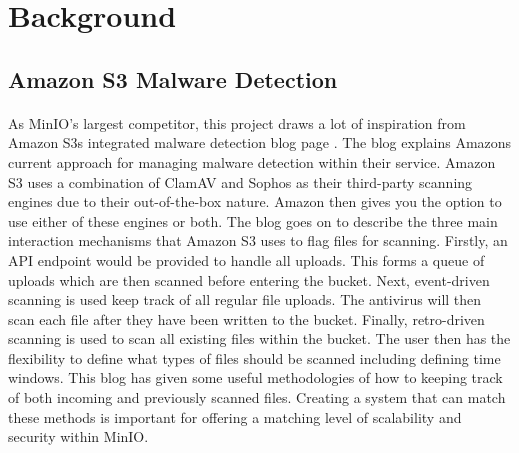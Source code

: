 \documentclass[12pt, conference, final, a4paper, onecolumn, compsoc]{IEEEtran}
\begin{document}
\section{Background}


%

%

\subsection*{Amazon S3 Malware Detection} %
\paragraph{}

As MinIO's largest competitor, this project draws a lot of inspiration from
Amazon S3s integrated malware detection blog page \citep{amazon-md}. The blog
explains Amazons current approach for managing malware detection within their
service. Amazon S3 uses a combination of ClamAV and Sophos as their third-party
scanning engines due to their out-of-the-box nature. Amazon then gives you the
option to use either of these engines or both. The blog goes on to describe the
three main interaction mechanisms that Amazon S3 uses to flag files for
scanning. Firstly, an API endpoint would be provided to handle all uploads. This
forms a queue of uploads which are then scanned before entering the bucket.
Next, event-driven scanning is used keep track of all regular file uploads. The
antivirus will then scan each file after they have been written to the bucket.
Finally, retro-driven scanning is used to scan all existing files within the
bucket. The user then has the flexibility to define what types of files should
be scanned including defining time windows. This blog has given some useful
methodologies of how to keeping track of both incoming and previously scanned
files. Creating a system that can match these methods is important for offering
a matching level of scalability and security within MinIO.


\end{document}
